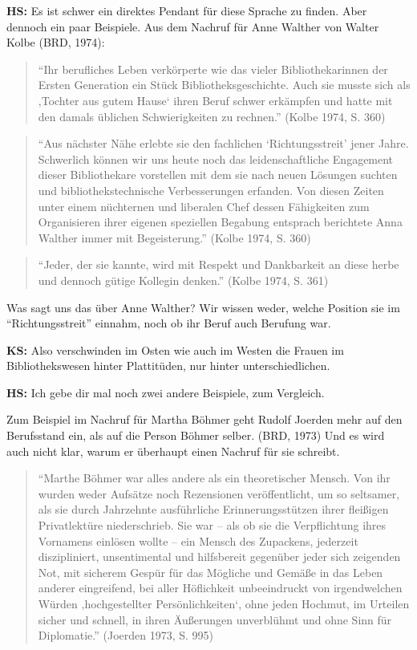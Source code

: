 \documentclass[a4paper,
fontsize=11pt,
oneside,
numbers=noperiodatend,
parskip=half-,
bibliography=totoc,
final
]{scrartcl}
\begin{document}
\textbf{HS:} Es ist schwer ein direktes Pendant für diese Sprache zu
finden. Aber dennoch ein paar Beispiele. Aus dem Nachruf für Anne
Walther von Walter Kolbe (BRD, 1974):

\begin{quote}
\enquote{Ihr berufliches Leben verkörperte wie das vieler
Bibliothekarinnen der Ersten Generation ein Stück Bibliotheksgeschichte.
Auch sie musste sich als ‚Tochter aus gutem Hause` ihren Beruf schwer
erkämpfen und hatte mit den damals üblichen Schwierigkeiten zu rechnen.}
(Kolbe 1974, S. 360)
\end{quote}

\begin{quote}
\enquote{Aus nächster Nähe erlebte sie den fachlichen
\enquote{Richtungsstreit} jener Jahre. Schwerlich können wir uns heute
noch das leidenschaftliche Engagement dieser Bibliothekare vorstellen
mit dem sie nach neuen Lösungen suchten und bibliothekstechnische
Verbesserungen erfanden. Von diesen Zeiten unter einem nüchternen und
liberalen Chef dessen Fähigkeiten zum Organisieren ihrer eigenen
speziellen Begabung entsprach berichtete Anna Walther immer mit
Begeisterung.} (Kolbe 1974, S. 360)
\end{quote}

\begin{quote}
\enquote{Jeder, der sie kannte, wird mit Respekt und Dankbarkeit an
diese herbe und dennoch gütige Kollegin denken.} (Kolbe 1974, S. 361)
\end{quote}

Was sagt uns das über Anne Walther? Wir wissen weder, welche Position
sie im \enquote{Richtungsstreit} einnahm, noch ob ihr Beruf auch
Berufung war.

\textbf{KS:} Also verschwinden im Osten wie auch im Westen die Frauen im
Bibliothekswesen hinter Plattitüden, nur hinter unterschiedlichen.

\textbf{HS:} Ich gebe dir mal noch zwei andere Beispiele, zum Vergleich.

Zum Beispiel im Nachruf für Martha Böhmer geht Rudolf Joerden mehr auf
den Berufsstand ein, als auf die Person Böhmer selber. (BRD, 1973) Und
es wird auch nicht klar, warum er überhaupt einen Nachruf für sie
schreibt.

\begin{quote}
\enquote{Marthe Böhmer war alles andere als ein theoretischer Mensch.
Von ihr wurden weder Aufsätze noch Rezensionen veröffentlicht, um so
seltsamer, als sie durch Jahrzehnte ausführliche Erinnerungsstützen
ihrer fleißigen Privatlektüre niederschrieb. Sie war -- als ob sie die
Verpflichtung ihres Vornamens einlösen wollte -- ein Mensch des
Zupackens, jederzeit diszipliniert, unsentimental und hilfsbereit
gegenüber jeder sich zeigenden Not, mit sicherem Gespür für das Mögliche
und Gemäße in das Leben anderer eingreifend, bei aller Höflichkeit
unbeeindruckt von irgendwelchen Würden ‚hochgestellter
Persönlichkeiten`, ohne jeden Hochmut, im Urteilen sicher und schnell,
in ihren Äußerungen unverblühmt und ohne Sinn für Diplomatie.} (Joerden
1973, S. 995)
\end{quote}
\end{document}

